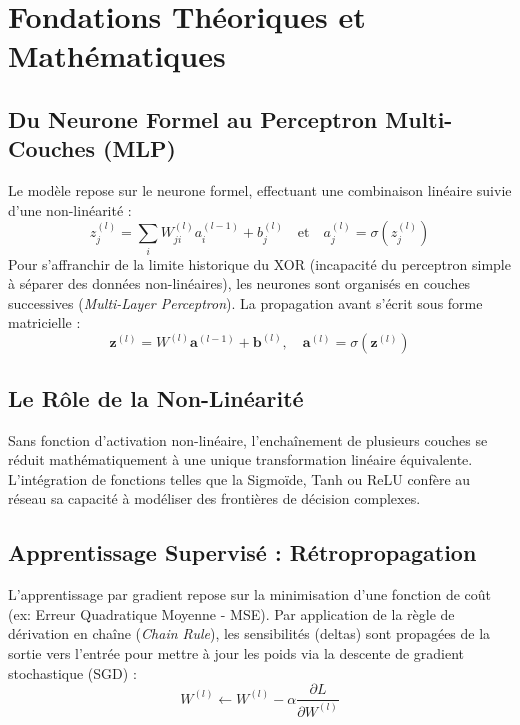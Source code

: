 \documentclass[11pt,a4paper]{article}
\begin{document}
\section{Fondations Théoriques et Mathématiques}

\subsection{Du Neurone Formel au Perceptron Multi-Couches (MLP)}
Le modèle repose sur le neurone formel, effectuant une combinaison linéaire suivie d'une non-linéarité :
\begin{equation}
    z_j^{(l)} = \sum_{i} W_{ji}^{(l)} a_i^{(l-1)} + b_j^{(l)} \quad \text{et} \quad a_j^{(l)} = \sigma(z_j^{(l)})
\end{equation}
Pour s'affranchir de la limite historique du XOR (incapacité du perceptron simple à séparer des données non-linéaires), les neurones sont organisés en couches successives (\textit{Multi-Layer Perceptron}). La propagation avant s'écrit sous forme matricielle :
\begin{equation}
    \mathbf{z}^{(l)} = W^{(l)} \mathbf{a}^{(l-1)} + \mathbf{b}^{(l)}, \quad \mathbf{a}^{(l)} = \sigma(\mathbf{z}^{(l)})
\end{equation}

\subsection{Le Rôle de la Non-Linéarité}
Sans fonction d'activation non-linéaire, l'enchaînement de plusieurs couches se réduit mathématiquement à une unique transformation linéaire équivalente. L'intégration de fonctions telles que la Sigmoïde, Tanh ou ReLU confère au réseau sa capacité à modéliser des frontières de décision complexes.

\subsection{Apprentissage Supervisé : Rétropropagation}
L'apprentissage par gradient repose sur la minimisation d'une fonction de coût (ex: Erreur Quadratique Moyenne - MSE). Par application de la règle de dérivation en chaîne (\textit{Chain Rule}), les sensibilités (deltas) sont propagées de la sortie vers l'entrée pour mettre à jour les poids via la descente de gradient stochastique (SGD) :
\begin{equation}
    W^{(l)} \leftarrow W^{(l)} - \alpha \frac{\partial L}{\partial W^{(l)}}
\end{equation}
\end{document}
